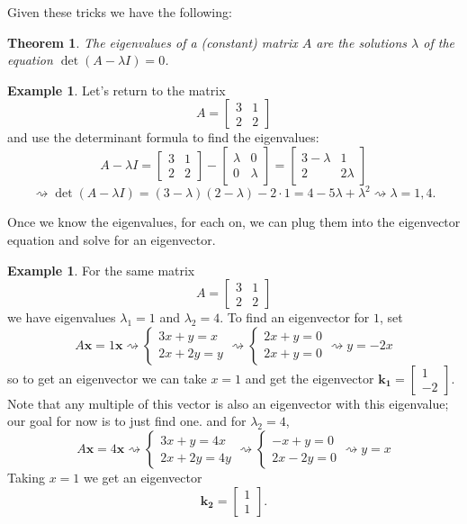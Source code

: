 \documentclass[12pt]{amsart}
\numberwithin{equation}{section}
\theoremstyle{plain} %
\newtheorem{thm}[equation]{Theorem}
\newcommand{\rsa}{\rightsquigarrow}
\theoremstyle{definition}
\newtheorem{ex}[equation]{Example}
\theoremstyle{remark}
\begin{document}
Given these tricks we have the following:

\begin{thm}  The eigenvalues of a (constant) matrix $A$ are the solutions $\lambda$ of the equation $\det(A-\lambda I)=0$.
\end{thm}

\begin{ex}
Let's return to the matrix
\[ A = \begin{bmatrix} 3 & 1  \\ 2 & 2\end{bmatrix}\] and use the determinant formula to find the eigenvalues:
\[A-\lambda I = \begin{bmatrix} 3 & 1  \\ 2 & 2\end{bmatrix} - \begin{bmatrix} \lambda & 0  \\ 0 & \lambda \end{bmatrix} = \begin{bmatrix} 3-\lambda & 1  \\ 2 & 2\lambda \end{bmatrix}\]
\[ \rsa \det(A-\lambda I) = (3-\lambda)(2-\lambda) - 2\cdot 1 = 4 -5\lambda + \lambda^2 \rsa \lambda = 1, 4.\]
\end{ex}

Once we know the eigenvalues, for each on, we can plug them into the eigenvector equation and solve for an eigenvector.

\begin{ex}
For the same matrix
\[ A = \begin{bmatrix} 3 & 1  \\ 2 & 2\end{bmatrix}\] we have eigenvalues $\lambda_1=1$ and $\lambda_2=4$. To find an eigenvector for $1$, set
\[ A \mathbf{x} = 1 \mathbf{x} \rsa \begin{cases} 3x + y = x \\ 2x + 2y = y \end{cases} \rsa \begin{cases} 2x+ y = 0\\ 2x+ y = 0\end{cases} \rsa y=-2x \]
so to get an eigenvector we can take $x=1$ and get the eigenvector $\mathbf{k_1} = \begin{bmatrix} 1 \\ -2\end{bmatrix}$.
Note that any multiple of this vector is also an eigenvector with this eigenvalue; our goal for now is to just find one.
and for $\lambda_2=4$,
\[ A \mathbf{x} = 4 \mathbf{x} \rsa \begin{cases} 3x + y = 4x \\ 2x + 2y = 4y \end{cases} \rsa \begin{cases} -x+ y = 0\\ 2x-2y = 0\end{cases}\rsa y=x\]
Taking $x=1$ we get an eigenvector
\[  \mathbf{k_2} = \begin{bmatrix} 1 \\ 1\end{bmatrix}.\]
\end{ex}
\end{document}

